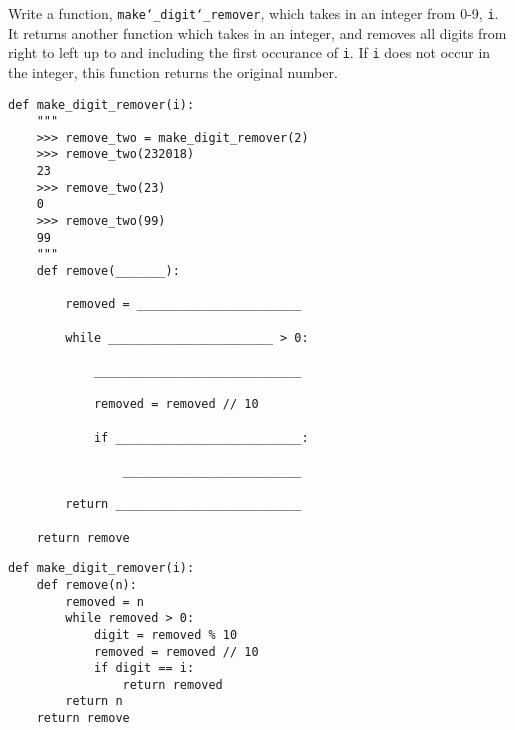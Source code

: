 \begin{blocksection}
\question Write a function, \texttt{make\char`_digit\char`_remover}, which takes in an integer from 0-9, \texttt{i}. It returns another function which takes in an integer, and removes all digits from right to left up to and including the first occurance of \texttt{i}. If \texttt{i} does not occur in the integer, this function returns the original number. \\

\begin{lstlisting}
def make_digit_remover(i):
    """
    >>> remove_two = make_digit_remover(2)
    >>> remove_two(232018)
    23
    >>> remove_two(23)
    0
    >>> remove_two(99)
    99
    """
    def remove(_______):

    	removed = _______________________

        while _______________________ > 0:

            _____________________________

            removed = removed // 10

            if __________________________:

                _________________________

        return __________________________

    return remove
\end{lstlisting}

\begin{solution}
\begin{lstlisting}
def make_digit_remover(i):
    def remove(n):
        removed = n
        while removed > 0:
            digit = removed % 10
            removed = removed // 10
            if digit == i:
                return removed
        return n
    return remove
\end{lstlisting}
\end{solution}
\end{blocksection}
